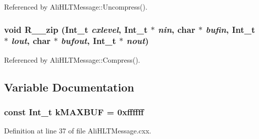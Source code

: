 Referenced by Ali\-HLTMessage::Uncompress().
\subsubsection{\setlength{\rightskip}{0pt plus 5cm}void R\_\-\_\-zip (Int\_\-t {\em cxlevel}, Int\_\-t $\ast$ {\em nin}, char $\ast$ {\em bufin}, Int\_\-t $\ast$ {\em lout}, char $\ast$ {\em bufout}, Int\_\-t $\ast$ {\em nout})}\label{AliHLTMessage_8cxx_a1}




Referenced by Ali\-HLTMessage::Compress().

\subsection{Variable Documentation}
\subsubsection{\setlength{\rightskip}{0pt plus 5cm}const Int\_\-t {\bf k\-MAXBUF} = 0xffffff}\label{AliHLTMessage_8cxx_a0}




Definition at line 37 of file Ali\-HLTMessage.cxx.
